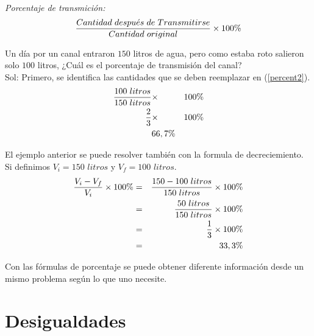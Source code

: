 \noindent \textit{Porcentaje de transmición:}\\

\begin{eqnarray}
\dfrac{Cantidad\hspace{3px}despu\acute{e} s\hspace{3px}de\hspace{3px}Transmitirse}{Cantidad\hspace{3px}original}\times 100\%
\label{percent2}
\end{eqnarray}

\begin{myexample}
Un día por un canal entraron $150$ litros de agua, pero como estaba roto salieron solo $100$ litros, ¿Cuál es el porcentaje de transmisión del canal?\\

Sol: Primero, se identifica las cantidades que se deben reemplazar en (\ref{percent2}). 
\begin{eqnarray*}
\dfrac{100 \hspace{3px}litros}{150\hspace{3px}litros}&\times & 100\%\\
\dfrac{2}{3}&\times & 100\%\\
& 66,7\% &
\end{eqnarray*}
\end{myexample}

\begin{myexample}
El ejemplo anterior se puede resolver también con la formula de decreciemiento. Si definimos $V_{i}=150$ $litros$ y $V_{f}=100$ $litros$. 
\begin{eqnarray*}
\dfrac{V_{i}-V_{f}}{V_{i}}\times 100\% &=&\dfrac{150-100\hspace{3px}litros}{150\hspace{3px}litros}\times 100\%\\
&=& \dfrac{50\hspace{3px}litros}{150\hspace{3px}litros}\times 100\%\\
&=&\dfrac{1}{3}\times 100\%\\
&=&33,3\%
\end{eqnarray*}
\end{myexample}

Con las fórmulas de porcentaje se puede obtener diferente información desde un mismo problema según lo que uno necesite.\\
 
\section{Desigualdades}

